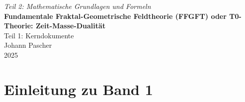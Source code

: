 


	
	\setcounter{section}{0}
	\setcounter{subsection}{0}
	\setcounter{subsubsection}{0}
	\setcounter{paragraph}{0}
	
	\setcounter{secnumdepth}{1}  %
	\makeatletter
	\renewcommand*\l@part[2]{%
		\ifnum \c@tocdepth >-2\relax
		\addpenalty{-\@highpenalty}%
		\addvspace{0.8em \@plus\p@}%
		{\leftskip 0em \relax
			\rightskip \@tocrmarg
			\parfillskip -\rightskip
			\parindent 0em \relax\@afterindenttrue
			\interlinepenalty\@M
			\leavevmode
			{\footnotesize\bfseries #1}\nobreak
			\leaders\hbox{$\m@th\mkern \@dotsep mu\hbox{}\mkern \@dotsep mu$}\hfill
			\nobreak\hb@xt@\@pnumwidth{\hss #2}\par}%
		\addvspace{0.2em \@plus\p@}%
		\nobreak
		\fi}
	\makeatother
	
	\renewcommand{\cftchapfont}{\footnotesize\bfseries}
	\renewcommand{\cftchappagefont}{\footnotesize\bfseries}
	\setlength{\cftbeforechapskip}{0.3em}
	
	\setcounter{tocdepth}{0}
	\begin{titlepage}
		\centering
		\vspace*{2cm}

		
		{\Large\itshape Teil 2: Mathematische Grundlagen und Formeln}\\[2cm]
	{\Huge\textbf{Fundamentale Fraktal-Geometrische Feldtheorie (FFGFT) oder T0-Theorie: Zeit-Masse-Dualität}}\\[1cm]
	{\Large Teil 1: Kerndokumente}\\[2cm]		
		{\large Johann Pascher}\\[1cm]
		
		{\large 2025}
		
		\vfill
	\end{titlepage}
	
	\frontmatter
	\pagestyle{fancy}
	\makeatletter
	\let\ps@plain\ps@fancy
	\let\ps@empty\ps@fancy
	\makeatother
	
	\mainmatter
	\pagestyle{fancy}
	
	\tableofcontents


	
	\chapter{Einleitung zu Band 1}
	
	
